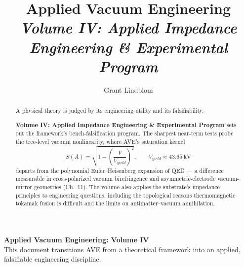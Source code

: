 \title{\textbf{Applied Vacuum Engineering} \\ \large \textit{Volume IV: Applied Impedance Engineering \& Experimental Program}}
\author{Grant Lindblom}
\date{}

\maketitle

\vfill
\noindent\textbf{Applied Vacuum Engineering: Volume IV} \\
This document transitions AVE from a theoretical framework into an applied, falsifiable engineering discipline.

\begin{abstract}
    A physical theory is judged by its engineering utility and its falsifiability.
    
    \textbf{Volume IV: Applied Impedance Engineering \& Experimental Program} sets out the framework's bench-falsification program. The sharpest near-term tests probe the tree-level vacuum nonlinearity, where AVE's saturation kernel
    \begin{equation}
        S(A) = \sqrt{1 - \left(\frac{V}{V_{yield}}\right)^2}, \qquad V_{yield} \approx 43.65\ \text{kV}
    \end{equation}
    departs from the polynomial Euler--Heisenberg expansion of QED --- a difference measurable in cross-polarized vacuum birefringence and asymmetric-electrode vacuum-mirror geometries (Ch.~11). The volume also applies the substrate's impedance principles to engineering questions, including the topological reasons thermomagnetic tokamak fusion is difficult and the limits on antimatter--vacuum annihilation.
\end{abstract}
